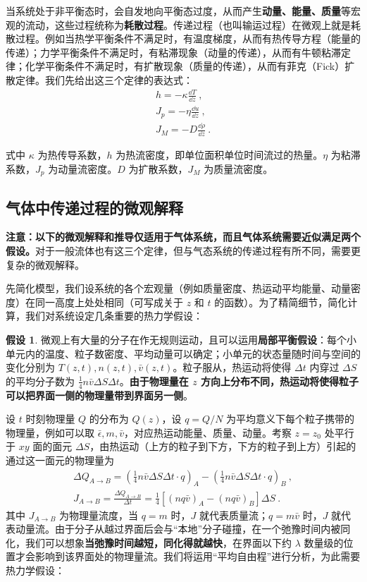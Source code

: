 

当系统处于非平衡态时，会自发地向平衡态过度，从而产生\textbf{动量、能量、质量}等宏观的流动，这些过程统称为\textbf{耗散过程}。传递过程（也叫输运过程）在微观上就是耗散过程。例如当热学平衡条件不满足时，有温度梯度，从而有热传导方程（能量的传递）；力学平衡条件不满足时，有粘滞现象（动量的传递），从而有牛顿粘滞定律；化学平衡条件不满足时，有扩散现象（质量的传递），从而有菲克（Fick）扩散定律。我们先给出这三个定律的表达式：
\begin{align}
h=-\kappa \frac{\dd T}{\dd z}~,\\
J_p=-\eta \frac{\dd u}{\dd z}~,\\
J_M=-D\frac{\dd \rho}{\dd z}~.
\end{align}

式中 $\kappa$ 为热传导系数，$h$ 为热流密度，即单位面积单位时间流过的热量。$\eta$ 为粘滞系数，$J_p$ 为动量流密度。$D$ 为扩散系数，$J_M$ 为质量流密度。

\subsection{气体中传递过程的微观解释}
\textbf{注意：以下的微观解释和推导仅适用于\textbf{气体系统}，而且气体系统需要近似满足两个假设。}对于一般流体也有这三个定律，但与气态系统的传递过程有所不同，需要更复杂的微观解释。

先简化模型，我们设系统的各个宏观量（例如质量密度、热运动平均能量、动量密度）在同一高度上处处相同（可写成关于 $z$ 和 $t$ 的函数）。为了精简细节，简化计算，我们对系统设定几条重要的热力学假设：

\textbf{假设 1}. 微观上有大量的分子在作无规则运动，且可以运用\textbf{局部平衡假设}：每个小单元内的温度、粒子数密度、平均动量可以确定；小单元的状态量随时间与空间的变化分别为 $T(z,t),n(z,t),\bar v(z,t)$。粒子服从，热运动将使得 $\Delta t$ 内穿过 $\Delta S$ 的平均分子数为 $\frac{1}{4}n\bar v \Delta S\Delta t$。\textbf{由于物理量在 $z$ 方向上分布不同，热运动将使得粒子可以把界面一侧的物理量带到界面另一侧}。

设 $t$ 时刻物理量 $Q$ 的分布为 $Q(z)$，设 $q=Q/N$ 为平均意义下每个粒子携带的物理量，例如可以取 $\bar \epsilon,m,\bar v$，对应热运动能量、质量、动量。考察 $z=z_0$ 处平行于 $xy$ 面的面元 $\Delta S$，由热运动（上方的粒子到下方，下方的粒子到上方）引起的通过这一面元的物理量为
\begin{align}
\Delta Q_{A\rightarrow B}=(\frac{1}{4}n\bar v \Delta S\Delta t\cdot q)_A-(\frac{1}{4}n\bar v \Delta S\Delta t\cdot q)_B~,
\\
J_{A\rightarrow B}=\frac{\Delta Q_{A\rightarrow B}}{\Delta t}=\frac{1}{4}[(nq\bar v)_A-(nq\bar v)_B]\Delta S~.
\end{align}
其中 $J_{A\rightarrow B}$ 为物理量流度，当 $q=m$ 时，$J$ 就代表质量流；$q=m\bar v$ 时，$J$ 就代表动量流。由于分子从越过界面后会与“本地”分子碰撞，在一个弛豫时间内被同化，我们可以想象\textbf{当弛豫时间越短，同化得就越快}，在界面以下约 $\lambda$ 数量级的位置才会影响到该界面处的物理量流。我们将运用“平均自由程”进行分析，为此需要热力学假设：

